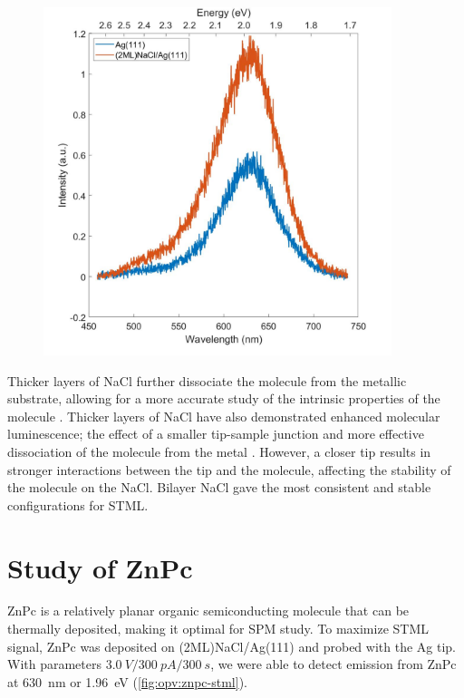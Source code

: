 \begin{figure} [h]
    \centering
    \includegraphics[width=4in]{pictures/NaCl_enhancement_Ag111_275V_250pA_10s.jpg}
    \caption{}
    \label{fig:opv:nacl-plasmon}
\end{figure}

Thicker layers of NaCl further dissociate the molecule from the metallic substrate, allowing for a more accurate study of the intrinsic properties of the molecule \citep{repp2005molecules}. Thicker layers of NaCl have also demonstrated enhanced molecular luminescence; the effect of a smaller tip-sample junction and more effective dissociation of the molecule from the metal \citep{Zhang2017,Kroger2018}. However, a closer tip results in stronger interactions between the tip and the molecule, affecting the stability of the molecule on the NaCl. Bilayer NaCl gave the most consistent and stable configurations for \ac{STML}.



\section{Study of {ZnPc}}

\ac{ZnPc} is a relatively planar organic semiconducting molecule that can be thermally deposited, making it optimal for \ac{SPM} study. To maximize \ac{STML} signal, ZnPc was deposited on (2ML)NaCl/Ag(111) and probed with the Ag tip. With parameters $\SI{3.0}{V}/\SI{300}{pA}/\SI{300}{s}$, we were able to detect emission from ZnPc at \SI{630}{nm} or \SI{1.96}{eV} (\autoref{fig:opv:znpc-stml}).

